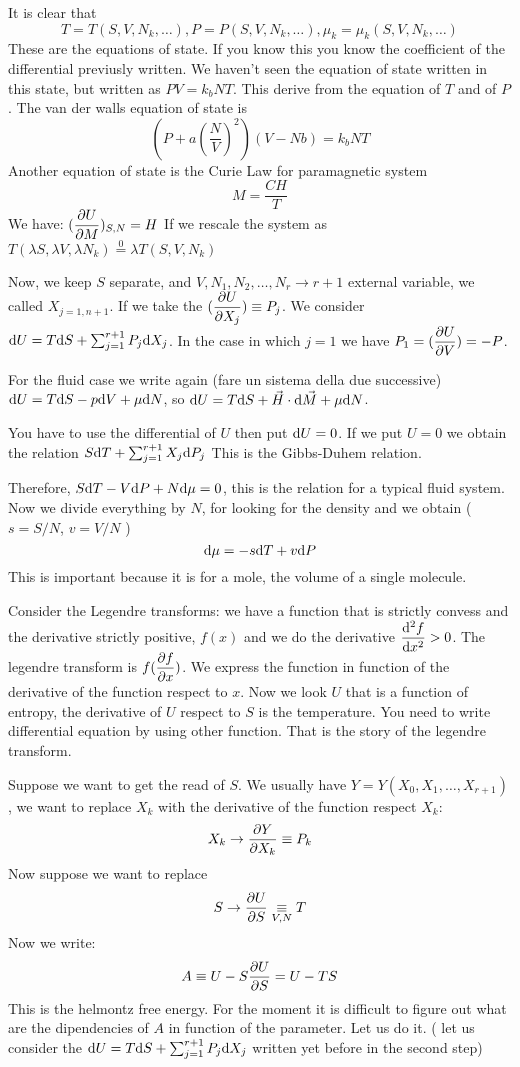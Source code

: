 \documentclass[../main/main.tex]{subfiles}
\begin{document}
It is clear that 
$$T= T(S,V,N_k, \dots), P= P(S,V,N_k, \dots), \mu_k= \mu_k(S,V,N_k, \dots)$$
These are the equations of state. If you know this you know the coefficient of the differential previusly written. 
We haven't seen the equation of state written in this state, but written as $P V = k_b N T $. This derive from the equation of $T$ and of $P$. The van der walls equation of state is
$$ \left( P + a (\frac{N}{V})^2 \right) ( V-N b) = k_b N T $$
Another equation of state is the Curie Law for paramagnetic system
$$ M = \frac{C H }{T} $$ 
We have: 
$ ( \displaystyle \frac{\partial U}{\partial M} )_{S,N} = H $ 
If we rescale the system as $T(\lambda S, \lambda V, \lambda N_k) \overset{0}{=} \lambda T (S,V,N_k)$

Now, we keep $S$ separate, and $V,N_1,N_2,\dots,N_r \rightarrow r+1$ external variable, we called $X_{j=1,n+1}$. If we take the
$ ( \displaystyle \frac{\partial U}{\partial X_j} ) \equiv P_j $.
We consider $\mathrm{d} U = T \mathrm{d} S + \sum_{j=1}^{r+1} P_j \mathrm{d} X_j $. In the case in which $j=1$ we have
$ P_1 = ( \displaystyle \frac{\partial U}{\partial V} ) = -P $.

For the fluid case we write again (fare un sistema della due successive) $\mathrm{d} U = T \mathrm{d} S - p \mathrm{d} V + \mu \mathrm{d} N $, so $\mathrm{d} U = T \mathrm{d} S + \vec{H} \cdot \mathrm{d} \vec{M} + \mu \mathrm{d} N $.

You have to use the differential of $U$ then put $\mathrm{d} U = 0 $. 
If we put $U=0$ we obtain the relation 
$ S \mathrm{d} T + \sum_{j=1}^{r+1} X_j \mathrm{d} P_j$
This is the Gibbs-Duhem relation. 

Therefore, $ S \mathrm{d} T - V \mathrm{d} P + N \mathrm{d} \mu = 0$, this is the relation for a typical fluid system. Now we divide everything by $N$, for looking for the density and we obtain ( $s= S/N$, $v=V/N$ )
$$ \mathrm{d} \mu = - s \mathrm{d} T + v \mathrm{d} P $$
This is important because it is for a mole, the volume of a single molecule. 

Consider the Legendre transforms: we have a function that is strictly convess and the derivative strictly positive, $f(x)$ and we do the derivative $\displaystyle \frac{\mathrm{d}^{2} f}{\mathrm{d} x^{2} } > 0 $. The legendre transform is $f ( \displaystyle \frac{\partial f}{\partial x} ) $. We express the function in function of the derivative of the function respect to $x$. 
Now we look $U$ that is a function of entropy, the derivative of $U$ respect to $S$ is the temperature. You need to write differential equation by using other function. That is the story of the legendre transform. 

 Suppose we want to get the read of $S$. We usually have $Y=Y (X_0,X_1,\dots,X_{r+1}) $, we want to replace $X_k$ with the derivative of the function respect  $X_k$:
 $$ X_k \rightarrow \displaystyle \frac{\partial Y}{\partial X_k} \equiv P_k $$ 
 Now suppose we want to replace
 $$ S \rightarrow \displaystyle \frac{\partial U}{\partial S} \underset{V,N} {\equiv } T $$ 
Now we write:
$$ A \equiv U - S \displaystyle \frac{\partial U}{\partial S} = U - T S $$ 
This is the helmontz free energy. 
For the moment it is difficult to figure out what are the dipendencies of $A$ in function of the parameter. Let us do it. ( let us consider the $\mathrm{d} U = T \mathrm{d} S + \sum_{j=1}^{r+1} P_j \mathrm{d} X_j $ written yet before in the second step)
\end{document}

